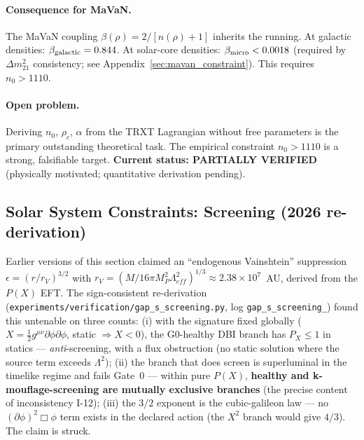 \documentclass[a4paper,12pt]{article}
\begin{document}
\paragraph{Consequence for MaVaN.}
The MaVaN coupling $\beta(\rho)=2/[n(\rho)+1]$ inherits the running.
At galactic densities: $\beta_{\rm galactic}=0.844$.
At solar-core densities: $\beta_{\rm micro}<0.0018$ (required by
$\Delta m^2_{21}$ consistency; see Appendix~\ref{sec:mavan_constraint}).
This requires $n_0>1110$.

\paragraph{Open problem.}
Deriving $n_0$, $\rho_c$, $\alpha$ from the TRXT Lagrangian without free
parameters is the primary outstanding theoretical task.  The empirical constraint
$n_0>1110$ is a strong, falsifiable target.
\textbf{Current status: PARTIALLY VERIFIED} (physically motivated;
quantitative derivation pending).

\subsection{Solar System Constraints: Screening (2026 re-derivation)}\label{sec:screening}

\begin{mdframed}[backgroundcolor=yellow!8, frametitle={2026 audit (GAP-S / registry item I-12): mechanism replaced}]
Earlier versions of this section claimed an ``endogenous Vainshtein'' suppression
$\epsilon = (r/r_V)^{3/2}$ with $r_V = (M/16\pi M_P^2\Lambda_{eff}^2)^{1/3} \approx
2.38\times10^7$~AU, derived from the $P(X)$ EFT. The sign-consistent re-derivation
(\texttt{experiments/\allowbreak verification/\allowbreak gap\_\allowbreak s\_\allowbreak screening.py}, log
\texttt{gap\_\allowbreak s\_\allowbreak screening\_}) found this untenable on three counts:
(i) with the signature fixed globally ($X = \frac12 g^{\mu\nu}\partial\phi\partial\phi$,
static $\Rightarrow X < 0$), the G0-healthy DBI branch has $P_X \le 1$ in statics ---
\emph{anti}-screening, with a flux obstruction (no static solution where the source term
exceeds $\Lambda^2$); (ii) the branch that does screen is superluminal in the timelike
regime and fails Gate~0 --- within pure $P(X)$, \textbf{healthy and k-mouflage-screening
are mutually exclusive branches} (the precise content of inconsistency I-12);
(iii) the $3/2$ exponent is the cubic-galileon law --- no $(\partial\phi)^2\Box\phi$ term
exists in the declared action (the $X^2$ branch would give $4/3$). The claim is struck.
\end{mdframed}
\end{document}
